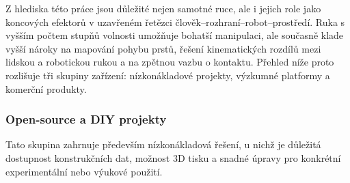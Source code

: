\documentclass[FZS,DP]{tulthesis}
\begin{document}
Z hlediska této práce jsou důležité nejen samotné ruce, ale i jejich role jako koncových efektorů v uzavřeném řetězci člověk--rozhraní--robot--prostředí. Ruka s vyšším počtem stupňů volnosti umožňuje bohatší manipulaci, ale současně klade vyšší nároky na mapování pohybu prstů, řešení kinematických rozdílů mezi lidskou a robotickou rukou a na zpětnou vazbu o kontaktu. Přehled níže proto rozlišuje tři skupiny zařízení: nízkonákladové projekty, výzkumné platformy a komerční produkty.

\subsubsection{Open-source a DIY projekty}

Tato skupina zahrnuje především nízkonákladová řešení, u nichž je důležitá dostupnost konstrukčních dat, možnost 3D tisku a snadné úpravy pro konkrétní experimentální nebo výukové použití.
\end{document}
